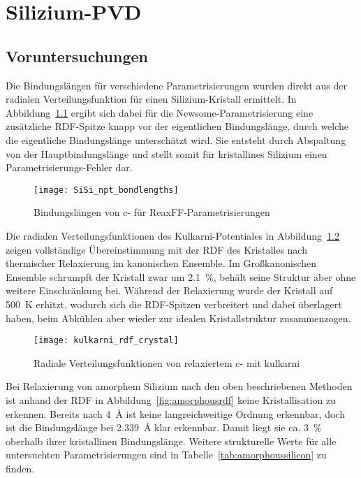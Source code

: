 \chapter{Silizium-PVD}
\label{appendix:silicon}

\section{Voruntersuchungen}

Die Bindungslängen für verschiedene Parametrisierungen wurden direkt aus der radialen Verteilungsfunktion für einen Silizium-Kristall ermittelt.
In Abbildung~\ref{fig:sisibondlengths} ergibt sich dabei für die Newsome-Parametrisierung eine zusätzliche RDF-Spitze knapp vor der eigentlichen Bindungslänge, durch welche die eigentliche Bindungslänge unterschätzt wird.
Sie entsteht durch Abspaltung von der Hauptbindungslänge und stellt somit für kristallines Silizium einen Parametrisierungs-Fehler dar.

\begin{figure}[!ht]
  \centering
  \texttt{[image: SiSi\_npt\_bondlengths]}
  \caption{Bindungslängen von c- für ReaxFF-Parametrisierungen}
  \label{fig:sisibondlengths}
\end{figure}

Die radialen Verteilungsfunktionen des Kulkarni-Potentiales in Abbildung~\ref{fig:kulkarnirdf} zeigen vollständige Übereinstimmung mit der RDF des Kristalles nach thermischer Relaxierung im kanonischen Ensemble.
Im Großkanonischen Ensemble schrumpft der Kristall zwar um \SI{2.1}{\percent}, behält seine Struktur aber ohne weitere Einschränkung bei.
Während der Relaxierung wurde der Kristall auf \SI{500}{\kelvin} erhitzt, wodurch sich die RDF-Spitzen verbreitert und dabei überlagert haben, beim Abkühlen aber wieder zur idealen Kristallstruktur zusammenzogen.

\begin{figure}[!ht]
  \centering
  \texttt{[image: kulkarni\_rdf\_crystal]}
  \caption[Radiale Verteilungsfunktionen von relaxiertem c-]{
    Radiale Verteilungsfunktionen von relaxiertem c- mit kulkarni
  }
  \label{fig:kulkarnirdf}
\end{figure}

Bei Relaxierung von amorphem Silizium nach den oben beschriebenen Methoden ist anhand der RDF in Abbildung~\ref{fig:amorphousrdf} keine Kristallisation zu erkennen.
Bereits nach \SI{4}{\angstrom} ist keine langreichweitige Ordnung erkennbar, doch ist die Bindungslänge bei \SI{2.339}{\angstrom} klar erkennbar.
Damit liegt sie ca. \SI{3}{\percent} oberhalb ihrer kristallinen Bindungslänge.
Weitere strukturelle Werte für alle untersuchten Parametrisierungen sind in Tabelle~\ref{tab:amorphoussilicon} zu finden.

